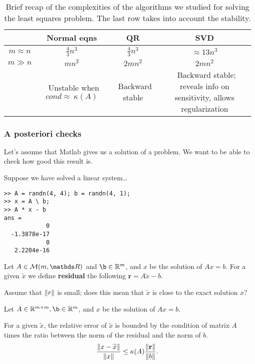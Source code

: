 \documentclass[computational_mathematics.tex]{subfiles}
\begin{document}
\begin{table}
\begin{center}
\begin{tabular}{cccc}
\toprule
  & \textbf{Normal eqns} & \textbf{QR} & \textbf{SVD}\\
	\midrule
$m \approx n$	& $\frac{4}{3}n^3$ & $\frac{4}{3}n^3$ & $\approx 13n^3$\\
\midrule
$m \gg n$ & $mn^2$ & $2mn^2$ & $2mn^2$\\
\midrule
& \parbox{3cm}{\raggedright~Unstable when $cond\approx~\kappa(A)$} & \parbox{2cm}{\raggedright~Backward stable} & \parbox{3cm}{\raggedright~Backward stable; reveals info on sensitivity, allows regularization}\\
\bottomrule
\end{tabular}
\end{center}\caption{Brief recap of the complexities of the algorithms we studied for solving the least squares problem. The last row takes into account the stability.}\label{tab:15nov1}
\end{table}

\subsubsection{A posteriori checks}

Let's assume that Matlab gives us a solution of a problem. We want to be able to check how good this result is.

\begin{example}
Suppose we have solved a linear system\dots

  \begin{verbatim}
>> A = randn(4, 4); b = randn(4, 1);
>> x = A \ b;
>> A * x - b
ans =
            0
  -1.3878e-17
            0
   2.2204e-16
\end{verbatim}
\end{example}

\begin{definition}[Residual]
  Let $A\in \mathcal{M}(m, {\R})$ and $\b\in\mathbb{R}^m$, and $x$ be the solution of $Ax=b$. For a given $\widetilde{x}$ we define \textbf{residual} the following $\mathbf{r}=A\widetilde{x}-b$. 
\end{definition}

Assume that $\left\lVert r\right\rVert$ is small; does this mean that $\widetilde{x}$ is close to the exact solution $x$?

\begin{theorem}
Let $A\in\mathbb{R}^{m\times m}, \b\in\mathbb{R}^m$, and $x$ be the solution of $Ax=b$.

  For a given $\widetilde{x}$, the relative error of $\widetilde{x}$ is bounded by the condition of matrix $A$ times the ratio between the norm of the residual and the norm of $b$.
\[
\frac{\left\lVert x - \widetilde{x}\right\rVert}{\left\lVert x\right\rVert} \leq \kappa(A) \frac{\left\lVert\mathbf{r}\right\rVert}{\left\lVert b\right\rVert}.	
\]
\end{theorem}
\end{document}
